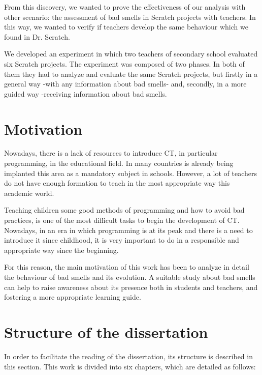 From this discovery, we wanted to prove the effectiveness of our analysis with other scenario: the assessment of bad smells in Scratch projects with teachers. In this way, we wanted to verify if teachers develop the same behaviour which we found in Dr. Scratch. 

We developed an experiment in which two teachers of secondary school evaluated six Scratch projects. The experiment was composed of two phases. In both of them they had to analyze and evaluate the same Scratch projects, but firstly in a general way -with any information about bad smells- and, secondly, in a more guided way -receiving information about bad smells. 


\section{Motivation}
\label{sec:motivation}

Nowadays, there is a lack of resources to introduce CT, in particular programming, in the educational field. In many countries is already being implanted this area as a mandatory subject in schools. However, a lot of teachers do not have enough formation to teach in the most appropriate way this academic world. 

Teaching children some good methods of programming and how to avoid bad practices, is one of the most difficult tasks to begin the development of CT. Nowadays, in an era in which programming is at its peak and there is a need to introduce it since childhood, it is very important to do in a responsible and appropriate way since the beginning. 

For this reason, the main motivation of this work has been to analyze in detail the behaviour of bad smells and its evolution. A suitable study about bad smells can help to raise awareness about its presence both in students and teachers, and fostering a more appropriate learning guide.


\section{Structure of the dissertation}
\label{sec:structure}

In order to facilitate the reading of the dissertation, its structure is described in this section. This work is divided into six chapters, which are detailed as follows:

